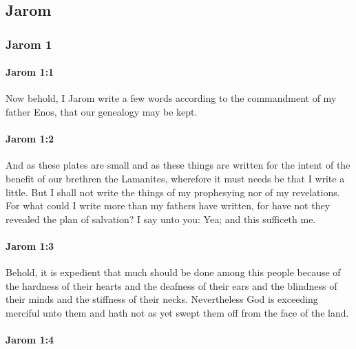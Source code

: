 \subsection{Jarom}
	\label{JAROM}

	\subsubsection{Jarom 1} %
		\label{JAROM-1}
	
		\paragraph{Jarom 1:1} %
			\label{JAROM-1-1}

			Now behold, I Jarom write a few words
			according to the commandment of my father Enos,
			that our genealogy may be kept.

		\paragraph{Jarom 1:2} %
			\label{JAROM-1-2}

			And as these plates are small
			and as these things are written
			for the intent of the benefit of our brethren the Lamanites,
			wherefore it must needs be that I write a little.
			But I shall not write the things of my prophesying nor of my revelations.
			For what could I write more than my fathers have written,
			for have not they revealed the plan of salvation?
			I say unto you: Yea;
			and this sufficeth me.

		\paragraph{Jarom 1:3} %
			\label{JAROM-1-3}

			Behold, it is expedient that much should be done among this people
			because of the hardness of their hearts and the deafness of their ears
			and the blindness of their minds and the stiffness of their necks.
			Nevertheless God is exceeding merciful unto them
			and hath not as yet swept them off from the face of the land.

		\paragraph{Jarom 1:4} %
			\label{JAROM-1-4}

